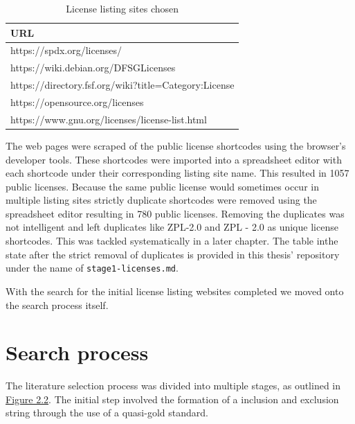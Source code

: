 \begin{table}[t]
	\begin{center}
		\begin{tabular}{||l||}
			\hline
			URL \\
			\hline
      https://spdx.org/licenses/ \\
      https://wiki.debian.org/DFSGLicenses \\
      https://directory.fsf.org/wiki?title=Category:License \\
      https://opensource.org/licenses \\
      https://www.gnu.org/licenses/license-list.html\\
			\hline
		\end{tabular}
		\caption{License listing sites chosen}
		\label{table:listing-sites}
	\end{center}
\end{table}

The web pages were scraped of the public license shortcodes using the browser's developer tools. These shortcodes were imported into a spreadsheet editor with each shortcode under their corresponding listing site name. This resulted in 1057 public licenses. Because the same public license would sometimes occur in multiple listing sites strictly duplicate shortcodes were removed using the spreadsheet editor resulting in 780 public licenses. Removing the duplicates was not intelligent and left duplicates like ZPL-2.0 and ZPL - 2.0 as unique license shortcodes. This was tackled systematically in a later chapter. The table inthe state after the strict removal of duplicates is provided in this thesis' repository \citep{mscthesis} under the name of \texttt{stage1-licenses.md}.

With the search for the initial license listing websites completed we moved onto the search process itself.

\section{Search process}
The literature selection process was divided into multiple stages, as outlined in \hyperref[fig:search-process]{Figure 2.2}. The initial step involved the formation of a inclusion and exclusion string through the use of a quasi-gold standard.

